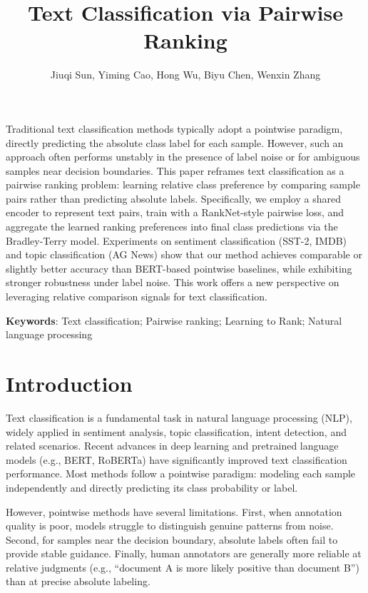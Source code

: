 \documentclass[11pt, a4paper]{article}
\title{Text Classification via Pairwise Ranking}
\author{%
  Jiuqi Sun, Yiming Cao, Hong Wu, Biyu Chen, Wenxin Zhang
}
\date{}
\makeatletter
\renewenvironment{abstract}{%
  \small
  \begin{center}%
    \bfseries \abstractname\vspace{-.5em}\vspace{\z@}%
  \end{center}%
  \par\vspace{0.5em}\ignorespaces
}{\par}
\makeatother
\begin{document}
\maketitle

\begin{abstract}
\hspace{\parindent}Traditional text classification methods typically adopt a pointwise paradigm, directly predicting the absolute class label for each sample. However, such an approach often performs unstably in the presence of label noise or for ambiguous samples near decision boundaries. This paper reframes text classification as a pairwise ranking problem: learning relative class preference by comparing sample pairs rather than predicting absolute labels. Specifically, we employ a shared encoder to represent text pairs, train with a RankNet-style pairwise loss, and aggregate the learned ranking preferences into final class predictions via the Bradley-Terry model. Experiments on sentiment classification (SST-2, IMDB) and topic classification (AG News) show that our method achieves comparable or slightly better accuracy than BERT-based pointwise baselines, while exhibiting stronger robustness under label noise. This work offers a new perspective on leveraging relative comparison signals for text classification.

\medskip
\noindent\textbf{Keywords}: Text classification; Pairwise ranking; Learning to Rank; Natural language processing
\end{abstract}

\section{Introduction}

Text classification is a fundamental task in natural language processing (NLP), widely applied in sentiment analysis, topic classification, intent detection, and related scenarios. Recent advances in deep learning and pretrained language models (e.g., BERT, RoBERTa) have significantly improved text classification performance. Most methods follow a pointwise paradigm: modeling each sample independently and directly predicting its class probability or label.

However, pointwise methods have several limitations. First, when annotation quality is poor, models struggle to distinguish genuine patterns from noise. Second, for samples near the decision boundary, absolute labels often fail to provide stable guidance. Finally, human annotators are generally more reliable at relative judgments (e.g., ``document A is more likely positive than document B'') than at precise absolute labeling.
\end{document}
